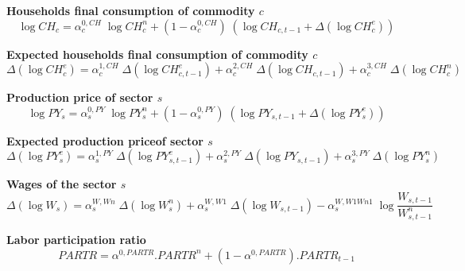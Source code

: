 \documentclass[12pt]{article}
\numberwithin{equation}{section}
\begin{document}
\noindent \textbf{Households final consumption of commodity $c$} 
\begin{dmath}
\operatorname{log} CH_{c} = \alpha^{{0},CH}_{c} \; \operatorname{log} CH^{n}_{c} + \left( 1 - \alpha^{{0},CH}_{c} \right) \; \left( \operatorname{log} CH_{c, t-1} + \varDelta \left(\operatorname{log} CH^{e}_{c}\right) \right)
\label{adjustments.mdlCH[c]}
\end{dmath}

\noindent \textbf{Expected households final consumption of commodity $c$} 
\begin{dmath}
\varDelta \left(\operatorname{log} CH^{e}_{c}\right) = \alpha^{{1},CH}_{c} \; \varDelta \left(\operatorname{log} CH^{e}_{c, t-1}\right) + \alpha^{{2},CH}_{c} \; \varDelta \left(\operatorname{log} CH_{c, t-1}\right) + \alpha^{{3},CH}_{c} \; \varDelta \left(\operatorname{log} CH^{n}_{c}\right)
\label{adjustments.mdlCH_e[c]}
\end{dmath}

\noindent \textbf{Production price of sector $s$} 
\begin{dmath}
\operatorname{log} PY_{s} = \alpha^{{0},PY}_{s} \; \operatorname{log} PY^{n}_{s} + \left( 1 - \alpha^{{0},PY}_{s} \right) \; \left( \operatorname{log} PY_{s, t-1} + \varDelta \left(\operatorname{log} PY^{e}_{s}\right) \right)
\label{adjustments.mdlPY[s]}
\end{dmath}

\noindent \textbf{Expected production priceof sector $s$} 
\begin{dmath}
\varDelta \left(\operatorname{log} PY^{e}_{s}\right) = \alpha^{{1},PY}_{s} \; \varDelta \left(\operatorname{log} PY^{e}_{s, t-1}\right) + \alpha^{{2},PY}_{s} \; \varDelta \left(\operatorname{log} PY_{s, t-1}\right) + \alpha^{{3},PY}_{s} \; \varDelta \left(\operatorname{log} PY^{n}_{s}\right)
\label{adjustments.mdlPY_e[s]}
\end{dmath}

\noindent \textbf{Wages of the sector $s$} 
\begin{dmath}
\varDelta \left(\operatorname{log} W_{s}\right) = \alpha^{W,Wn}_{s} \; \varDelta \left(\operatorname{log} W^{n}_{s}\right) + \alpha^{W,W1}_{s} \; \varDelta \left(\operatorname{log} W_{s, t-1}\right) - \alpha^{W,W1Wn1}_{s} \; \operatorname{log} \frac{W_{s, t-1}}{W^{n}_{s, t-1}}
\label{adjustments.mdlW[s]}
\end{dmath}

\noindent \textbf{Labor participation ratio} 
\begin{dmath}
PARTR = \alpha^{{0},PARTR} . PARTR^{n} + \left( 1 - \alpha^{{0},PARTR} \right) . PARTR_{t-1}
\label{adjustments.mdlPARTR}
\end{dmath}
\end{document}
